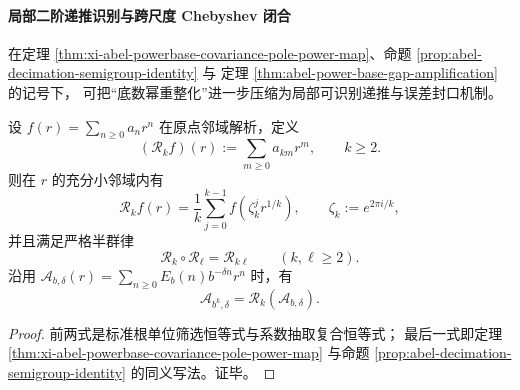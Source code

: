 \paragraph{局部二阶递推识别与跨尺度 Chebyshev 闭合}
在定理 \ref{thm:xi-abel-powerbase-covariance-pole-power-map}、命题 \ref{prop:abel-decimation-semigroup-identity} 与
定理 \ref{thm:abel-power-base-gap-amplification} 的记号下，
可把“底数幂重整化”进一步压缩为局部可识别递推与误差封口机制。

\begin{proposition}[抽取算子的根单位滤波表示与半群闭合]\label{prop:xi-abel-Rk-root-filter-semigroup}
设 \(f(r)=\sum_{n\ge 0}a_n r^n\) 在原点邻域解析，定义
\[
(\mathcal R_k f)(r):=\sum_{m\ge 0}a_{km}r^m,\qquad k\ge 2.
\]
则在 \(r\) 的充分小邻域内有
\[
\mathcal R_k f(r)
=\frac1k\sum_{j=0}^{k-1}f\!\left(\zeta_k^j r^{1/k}\right),
\qquad
\zeta_k:=e^{2\pi i/k},
\]
并且满足严格半群律
\[
\mathcal R_k\circ\mathcal R_\ell=\mathcal R_{k\ell}\qquad(k,\ell\ge 2).
\]
沿用
\(
\mathcal A_{b,\delta}(r)=\sum_{n\ge 0}E_b(n)b^{-\delta n}r^n
\)
时，有
\[
\mathcal A_{b^k,\delta}=\mathcal R_k(\mathcal A_{b,\delta}).
\]
\end{proposition}
\begin{proof}
前两式是标准根单位筛选恒等式与系数抽取复合恒等式；
最后一式即定理 \ref{thm:xi-abel-powerbase-covariance-pole-power-map} 与命题
\ref{prop:abel-decimation-semigroup-identity} 的同义写法。证毕。
\end{proof}

